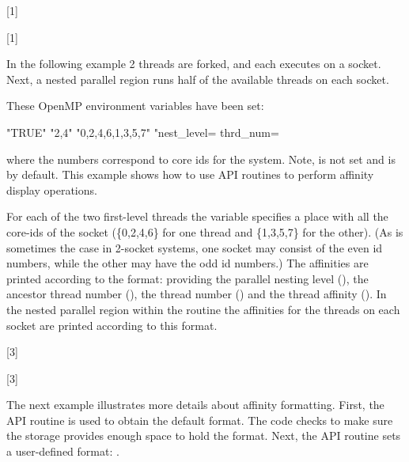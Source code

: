 [1]

[1]


In the following example 2 threads are forked, and each executes on a socket. Next,
a nested parallel region runs half of the available threads on each socket.

These OpenMP environment variables have been set:

\begin{boxeducode}
"TRUE"
"2,4"
"{0,2,4,6},{1,3,5,7}"
"nest_level= %
thrd_num= %
\end{boxeducode}

where the numbers correspond to core ids for the system. Note,  is not
set and is  by default.  This example shows how to use API routines to
perform affinity display operations.

For each of the two first-level threads the  variable specifies
a place with all the core-ids of the socket (\{0,2,4,6\} for one thread and \{1,3,5,7\} for the other).
(As is sometimes the case in 2-socket systems, one socket may consist
of the even id numbers, while the other may have the odd id numbers.)  The affinities
are printed according to the  format: providing
the parallel nesting level (), the ancestor thread number (), the thread number ()
and the thread affinity (). In the nested parallel region within the  routine
the affinities for the threads on each socket are printed according to this format.

[3]

[3]

{}
The next example illustrates more details about affinity formatting.
First, the  API routine is used to 
obtain the default format. The code checks to make sure the storage 
provides enough space to hold the format.  
Next, the  API routine sets a user-defined 
format: .   

